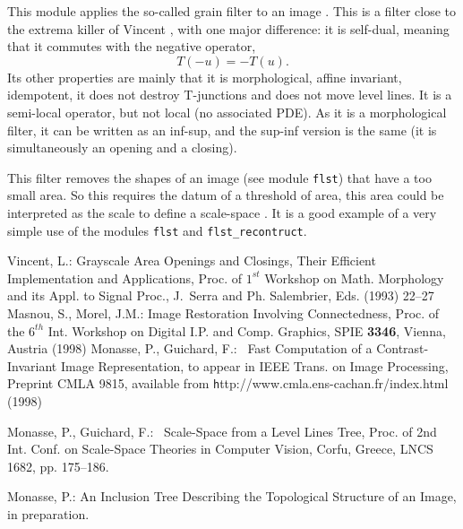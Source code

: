 This module applies the so-called grain filter to an image \cite{Masnou}.
This is a filter close to the extrema killer of Vincent \cite{Vincent}, with
one major difference: it is self-dual, meaning that it commutes with the
negative operator,
$$
T(-u) = -T(u).
$$
Its other properties are mainly that it is morphological, affine invariant,
idempotent,
it does not destroy T-junctions and does not move level lines. It is a
semi-local operator, but not local (no associated PDE).
As it is a morphological filter, it can be written as an inf-sup, and the
sup-inf version is the same (it is simultaneously an opening and a closing).

This filter removes the shapes of an image (see module \verb+flst+) that
have a too small area. So this requires the datum of a threshold of area, this
area could be interpreted as the scale to define a scale-space
\cite{ss99,fllt_theory}.
It is a good example of a very simple use of the modules \verb+flst+ and
\verb+flst_recontruct+.

\begin{thebibliography}{9}
Vincent, L.:
Grayscale Area Openings and Closings, Their Efficient
  Implementation and Applications,
Proc. of $1^{st}$ Workshop on Math. Morphology and its Appl.
  to Signal Proc., J.~Serra and Ph. Salembrier, Eds. (1993) 22--27
Masnou, S., Morel, J.M.:
Image Restoration Involving Connectedness,
Proc. of the $6^{th}$ Int. Workshop on Digital I.P. and Comp.
  Graphics, SPIE {\bf 3346}, Vienna, Austria (1998)
                                                                                Monasse, P., Guichard, F.:~
Fast Computation of a Contrast-Invariant Image Representation,
to appear in IEEE Trans. on Image Processing,
Preprint CMLA 9815, available from {\texttt
http://www.cmla.ens-cachan.fr/index.html} (1998)

 Monasse, P., Guichard, F.:~
Scale-Space from a Level Lines Tree,
Proc. of 2nd Int. Conf. on Scale-Space Theories in Computer
Vision, Corfu, Greece, LNCS 1682, pp. 175--186.

Monasse, P.:
An Inclusion Tree Describing the Topological Structure of an Image,
in preparation.
\end{thebibliography}
